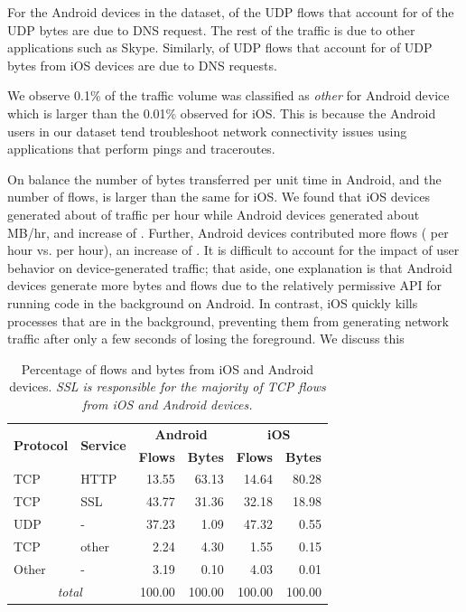 For the Android devices in the \moball dataset,  of the UDP flows that account for  of the UDP bytes are due to DNS request. 
The rest of the traffic is due to other applications such as Skype. 
Similarly,  of UDP flows that account for  of UDP bytes from iOS devices are due to DNS requests. 

We observe 0.1\% of the traffic volume was classified as \emph{other} for Android device which is larger than the 0.01\% observed for iOS. 
This is because the Android users in our dataset tend troubleshoot network connectivity issues using applications that perform pings and traceroutes. 

On balance the number of bytes transferred per unit time in Android, and the number of flows, is larger than the same for iOS. 
We found that iOS devices generated about  of traffic per hour while Android devices generated about MB/hr, and increase of .
Further, Android devices contributed more flows ( per hour vs.  per hour), an  increase of . 
It is difficult to account for the impact of   user behavior on device-generated traffic; that aside, one explanation is that Android devices generate more bytes and flows due to the relatively permissive API for running code in the background on Android. 
In contrast, iOS quickly kills processes that are in the background, preventing them from  generating network traffic after only a few seconds of losing the foreground. 
We discuss this 


\begin{table}
\begin{center}
\begin{small}
\begin{tabular}{|l|l|r|r|r|r|}
\hline
\multirow{2}{*}{\bf Protocol} & \multirow{2}{*}{\bf Service} & \multicolumn{2}{|c|}{\bf Android} & \multicolumn{2}{|c|}{\bf iOS} \tabularnewline
\cline{3-6}
           &           &  \textbf{Flows}  &  \textbf{Bytes}  &  \textbf{Flows}  &  \textbf{Bytes}  \tabularnewline
\hline
 TCP       &  HTTP     &  13.55  &  63.13  &  14.64  &  80.28  \tabularnewline
\hline
TCP       &  SSL      &  43.77  &  31.36  &  32.18  &  18.98  \tabularnewline
\hline
 UDP       &  -        &  37.23  &   1.09  &  47.32  &   0.55  \tabularnewline
\hline
 TCP       &  other    &   2.24  &   4.30  &   1.55  &   0.15  \tabularnewline
\hline
 Other     &  -        &   3.19  &   0.10  &   4.03  &   0.01  \tabularnewline
\hline
\multicolumn{2}{|c|}{\emph{total}} & 100.00 & 100.00 & 100.00 & 100.00 \tabularnewline
\hline
\end{tabular}
\end{small}
\end{center}
\caption{Percentage of flows and bytes from iOS and Android devices.
 \emph{SSL is responsible for the
majority of TCP flows from iOS and Android devices.}}
\label{tab:summaryIOSAndroidTraffic}
\end{table}

